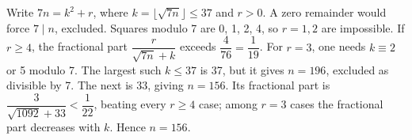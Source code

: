 Write $7n=k^2+r$, where $k=\lfloor\sqrt{7n}\rfloor\le37$ and $r>0$. A zero remainder would force $7\mid n$, excluded. Squares modulo 7 are 0, 1, 2, 4, so $r=1,2$ are impossible. If $r\ge4$, the fractional part $\dfrac{r}{\sqrt{7n}+k}$ exceeds $\dfrac{4}{76}=\dfrac{1}{19}$. For $r=3$, one needs $k\equiv2$ or 5 modulo 7. The largest such $k\le37$ is 37, but it gives $n=196$, excluded as divisible by 7. The next is 33, giving $n=156$. Its fractional part is $\dfrac{3}{\sqrt{1092}+33}<\dfrac{1}{22}$, beating every $r\ge4$ case; among $r=3$ cases the fractional part decreases with $k$. Hence $\boxed{n=156}$.
